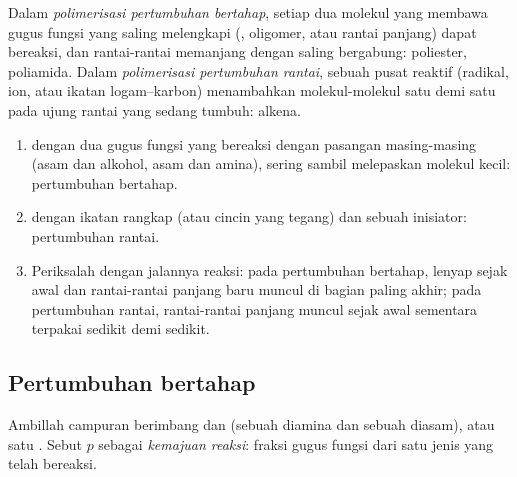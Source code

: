 \begin{definition}\label{def:b2:polymer-synthesis:step-chain}
Dalam \emph{polimerisasi pertumbuhan bertahap},
setiap dua molekul yang membawa gugus fungsi yang saling melengkapi
(, oligomer, atau rantai panjang) dapat bereaksi, dan rantai-rantai
memanjang dengan saling bergabung: poliester, poliamida. Dalam
\emph{polimerisasi pertumbuhan
rantai}, sebuah pusat reaktif
(radikal, ion, atau ikatan logam--karbon) menambahkan molekul-molekul 
satu demi satu pada ujung rantai yang sedang tumbuh:  alkena.
\end{definition}

\begin{method}\label{met:b2:polymer-synthesis:classify}
\begin{enumerate}
  \item {} dengan dua gugus fungsi yang bereaksi dengan pasangan
        masing-masing (asam dan alkohol, asam dan amina), sering sambil
        melepaskan molekul kecil: pertumbuhan bertahap.
  \item {} dengan ikatan rangkap  (atau cincin yang tegang) dan
        sebuah inisiator: pertumbuhan rantai.
  \item Periksalah dengan jalannya reaksi: pada pertumbuhan bertahap, 
        lenyap sejak awal dan rantai-rantai panjang baru muncul di bagian
        paling akhir; pada pertumbuhan rantai, rantai-rantai panjang muncul
        sejak awal sementara  terpakai sedikit demi sedikit.
\end{enumerate}
\end{method}

\subsection*{Pertumbuhan bertahap}

Ambillah campuran berimbang   dan  (sebuah diamina
dan sebuah diasam), atau satu  . Sebut $p$ sebagai
\emph{kemajuan reaksi}: fraksi gugus fungsi dari satu jenis yang telah
bereaksi.

